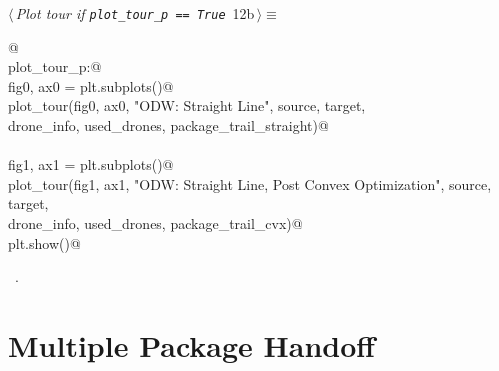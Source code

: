 \documentclass[10pt, english, oneside]{report}
\begin{document}
\begin{flushleft} \small
\begin{minipage}{\linewidth}\label{scrap12}\raggedright\small
{} $\langle\,${\itshape Plot tour if \verb|plot_tour_p == True|}\nobreak\ {\footnotesize {12b}}$\,\rangle\equiv$
\vspace{-1ex}
\begin{list}{}{} \item
\mbox{}\verb@   @\\
\mbox{}\verb@if plot_tour_p:@\\
\mbox{}\verb@     fig0, ax0 = plt.subplots()@\\
\mbox{}\verb@     plot_tour(fig0, ax0, "ODW: Straight Line", source, target, \@\\
\mbox{}\verb@               drone_info, used_drones, package_trail_straight)@\\
\mbox{}\verb@@\\
\mbox{}\verb@     fig1, ax1 = plt.subplots()@\\
\mbox{}\verb@     plot_tour(fig1, ax1, "ODW: Straight Line, Post Convex Optimization", source, target, \@\\
\mbox{}\verb@               drone_info, used_drones, package_trail_cvx)@\\
\mbox{}\verb@     plt.show()@\\
\mbox{}\verb@@{\NWsep}
\end{list}
\vspace{-1.5ex}
\footnotesize
\begin{list}{}{\setlength{\itemsep}{-\parsep}\setlength{\itemindent}{-\leftmargin}}
\item \NWtxtMacroRefIn\ .

\item{}
\end{list}
\end{minipage}\vspace{4ex}
\end{flushleft}










\chapter{Multiple Package Handoff}

\end{document}
